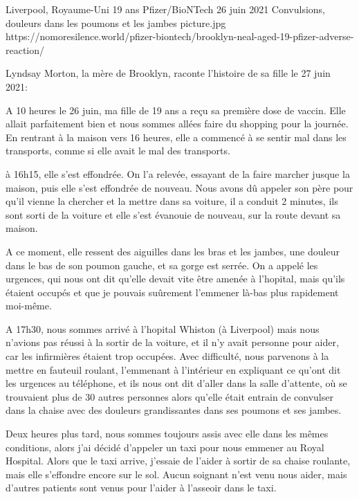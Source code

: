           {Liverpool, Royaume-Uni}
          {19 ans}
          {Pfizer/BioNTech}
          {26 juin 2021}
          {Convulsions, douleurs dans les poumons et les jambes
          }
          {picture.jpg}
          {https://nomoresilence.world/pfizer-biontech/brooklyn-neal-aged-19-pfizer-adverse-reaction/}
          {

\normalsize

Lyndsay Morton, la mère de Brooklyn, raconte l'histoire de sa fille le 27 juin
2021:

A 10 heures le 26 juin, ma fille de 19 ans a reçu sa première dose de
vaccin. Elle allait parfaitement bien et nous sommes allées faire du shopping
pour la journée. En rentrant à la maison vers 16 heures, elle a commencé à se
sentir mal dans les transports, comme si elle avait le mal des transports.

à 16h15, elle s'est effondrée. On l'a relevée, essayant de la faire marcher
jusque la maison, puis elle s'est effondrée de nouveau. Nous avons dû appeler
son père pour qu'il vienne la chercher et la mettre dans sa voiture, il a
conduit 2 minutes, ils sont sorti de la voiture et elle s'est évanouie de
nouveau, sur la route devant sa maison.

A ce moment, elle ressent des aiguilles dans les bras et les jambes, une douleur
dans le bas de son poumon gauche, et sa gorge est serrée. On a appelé les
urgences, qui nous ont dit qu'elle devait vite être amenée à l'hopital, mais
qu'ils étaient occupés et que je pouvais suûrement l'emmener là-bas plus
rapidement moi-même.

A 17h30, nous sommes arrivé à l'hopital Whiston (à Liverpool) mais nous n'avions
pas réussi à la sortir de la voiture, et il n'y avait personne pour aider, car
les infirmières étaient trop occupées. Avec difficulté, nous parvenons à la
mettre en fauteuil roulant, l'emmenant à l'intérieur en expliquant ce qu'ont dit
les urgences au téléphone, et ils nous ont dit d'aller dans la salle d'attente,
où se trouvaient plus de 30 autres personnes alors qu'elle était entrain de
convulser dans la chaise avec des douleurs grandissantes dans ses poumons et ses
jambes.

Deux heures plus tard, nous sommes toujours assis avec elle dans les mêmes
conditions, alors j'ai décidé d'appeler un taxi pour nous emmener au Royal
Hospital. Alors que le taxi arrive, j'essaie de l'aider à sortir de sa chaise
roulante, mais elle s'effondre encore sur le sol. Aucun soignant n'est venu nous
aider, mais d'autres patients sont venus pour l'aider à l'asseoir dans le taxi.

}
